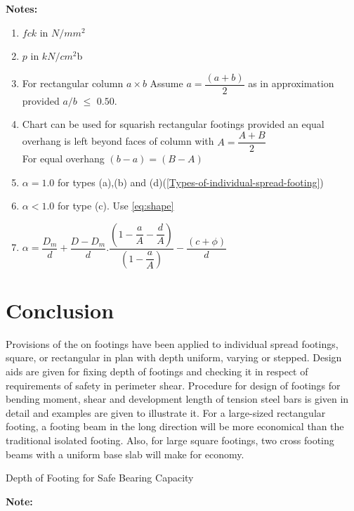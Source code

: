 \textbf{Notes:}
\begin{enumerate}
\item  $fck$ in $N/mm^2$
\item $p$ in $kN/cm^2$b
\item For rectangular column $a\times b$
Assume $a=\dfrac{(a+b)}{2}$ as in approximation provided $a/b$ $\leq$ $0.50.$
\item Chart can be used for squarish rectangular footings provided an 
equal overhang is left beyond faces of column with $A=\dfrac{A+B}{2}$\\
For equal overhang $(b-a)=(B-A)$
\item $\alpha=1.0$ for types (a),(b) and (d)(\figmacro \ref{Types-of-individual-spread-footing})
\item $\alpha<1.0$ for type (c). Use \equmacro \ref{eq:shape}
\item $\alpha=\dfrac{D_m}{d}+\dfrac{D-D_m}{d}.\dfrac{\left(1-\dfrac{a}{A}-\dfrac{d}{A}\right)}{\left(1-\dfrac{a}{A}\right)}-\dfrac{(c+\phi)}{d}$
\end{enumerate}

\section{Conclusion}
Provisions of the   on footings have been applied to individual spread
footings, square, or rectangular in plan with depth uniform, varying or 
stepped. Design aids are given for  fixing depth of footings and checking
it in respect of requirements of safety in perimeter shear. Procedure for
design of footings for bending moment, shear and development length of 
tension steel bars is given in detail and examples are given to illustrate it.
For a large-sized rectangular footing, a footing beam in the long direction 
will be more economical than the traditional isolated footing. Also, for
large square footings, two cross footing beams with a uniform base slab
will make for economy.

\begin{table}[h!]\centering
        \caption{Depth of Footing for Safe Bearing Capacity}
        \label{chaptertable}
\end{table}

\textbf{Note:}

~\cite{is4562000}
~\cite{aci1981aci}
~\cite{aci31877}
\printbibliography
